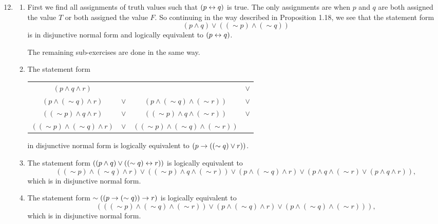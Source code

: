 \solutions{}

\begin{enumerate}
  \setcounter{enumi}{11}
  \item %
    \begin{enumerate}[label = (\alph*), align = left]
      \item First we find all assignments of truth values such that \((p \leftrightarrow q)\) is true. The only assignments are when \(p\) and \(q\) are both assigned the value \(T\) or both assigned the value \(F\). So continuing in the way described in Proposition 1.18, we see that the statement form
          \[(p \land q) \lor ((\sim p) \land (\sim q))\]
        is in disjunctive normal form and logically equivalent to \((p \leftrightarrow q)\).

        The remaining sub-exercises are done in the same way.

      \item The statement form
        \begin{center}
          \begin{tabular}{cccc}
            \((p \land q \land r)\)&
            &
            &
            \(\lor\)\\
            \((p \land (\sim q) \land r)\)&
            \(\lor\)&
            \((p \land (\sim q) \land (\sim r))\)&
            \(\lor\)\\
            \(((\sim p) \land q \land r)\)&
            \(\lor\)&
            \(((\sim p) \land q \land (\sim r))\)&
            \(\lor\)\\
            \(((\sim p) \land (\sim q) \land r)\)&
            \(\lor\)&
            \(((\sim p) \land (\sim q) \land (\sim r))\)&
          \end{tabular}
        \end{center}
        in disjunctive normal form is logically equivalent to \((p \rightarrow ((\sim q) \lor r))\).

      \item The statement form \(((p \land q) \lor ((\sim q) \leftrightarrow r))\) is logically equivalent to
        \[((\sim p) \land (\sim q) \land r) \lor ((\sim p) \land q \land (\sim r)) \lor (p \land (\sim q) \land r) \lor (p \land q \land (\sim r) \lor (p \land q \land r)),\]
        which is in disjunctive normal form.

      \item The statement form \(\sim ((p \rightarrow (\sim q)) \rightarrow r)\) is logically equivalent to
        \[(((\sim p) \land (\sim q) \land (\sim r)) \lor (p \land (\sim q) \land r) \lor (p \land (\sim q) \land (\sim r))),\]
        which is in disjunctive normal form.


\end{enumerate}
\end{enumerate}
